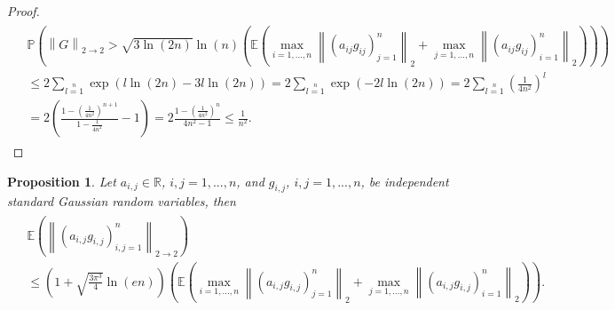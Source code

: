 \documentclass[12pt,a4paper]{article}
\newtheorem{proposition}[satz]{Proposition}
\newcommand{\R}{\ensuremath{{\mathbb R}}}
\newcommand{\Pv}{\mathbb{P}}
\newcommand{\Ex}{\mathbb{E}}
\newcommand{\norm}[1]{\left \lVert#1 \right\rVert}
\begin{document}
\begin{proof}
\begin{eqnarray*}
\left.\begin{split}
& \Pv\left(\norm{G}_{2\rightarrow 2}>\sqrt{3\ln(2n)}\ln(n)
\left(\Ex\left(\max\limits_{i=1,...,n}\norm{(a_{ij}g_{ij})_{j=1}^n}_2+
\max\limits_{j=1,...,n}\norm{(a_{ij}g_{ij})_{i=1}^n}_2\right)\right)\right)\\
& \leq2 \sum\limits_{l=1}\limits^n\exp\left(l\ln(2n)-3l\ln(2n)\right)
=2\sum\limits_{l=1}\limits^n\exp\left(-2l\ln(2n)\right)
=2\sum\limits_{l=1}\limits^n\left(\frac{1}{4n^2}\right)^l\\
&=2\left(\frac{1-\left(\frac{1}{4n^2}\right)^{n+1}}{1-\frac{1}{4n^2}}-1\right)
=2\frac{1-\left(\frac{1}{4n^2}\right)^n}{4n^2-1}
\leq\frac{1}{n^2}.
\end{split}\right.
\end{eqnarray*}
\end{proof}




\vskip 3mm


\begin{proposition}\label{prop:mitn} Let $a_{i,j}\in\R$, $i,j=1,...,n$, and $g_{i,j}$, $i,j=1,...,n$, be independent standard Gaussian random variables, then 
\begin{eqnarray*}
	\left.\begin{split}
	&\Ex\left(\norm{(a_{i,j}g_{i,j})_{i,j=1}^n}_{2\rightarrow 2}\right)  \\
	&\leq\left(1+\sqrt{\frac{3\pi^{3}}{4}}\ln(en)\right)
\left(\Ex\left(\max\limits_{i=1,...,n}\norm{(a_{i,j}g_{i,j})_{j=1}^n}_2+
\max\limits_{j=1,...,n}\norm{(a_{i,j}g_{i,j})_{i=1}^n}_2\right)\right).
	\end{split}\right.
	\end{eqnarray*}
\end{proposition}
\vskip 3mm
\end{document}
